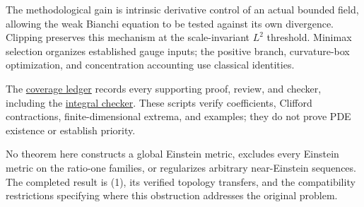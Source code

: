 \documentclass[
  english,
]{article}
\begin{document}
The methodological gain is intrinsic derivative control of an actual
bounded field, allowing the weak Bianchi equation to be tested against
its own divergence. Clipping preserves this mechanism at the
scale-invariant \(L^2\) threshold. Minimax selection organizes
established gauge inputs; the positive branch, curvature-box
optimization, and concentration accounting use classical identities.

The \href{../coverage/01_rigidity_coverage.tsv}{coverage ledger} records
every supporting proof, review, and checker, including the
\href{../proofs/round4_rigidity_check.py}{integral checker}. These
scripts verify coefficients, Clifford contractions, finite-dimensional
extrema, and examples; they do not prove PDE existence or establish
priority.

No theorem here constructs a global Einstein metric, excludes every
Einstein metric on the ratio-one families, or regularizes arbitrary
near-Einstein sequences. The completed result is (1), its verified
topology transfers, and the compatibility restrictions specifying where
this obstruction addresses the original problem.
\end{document}
